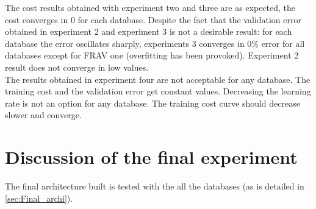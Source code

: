The cost results obtained with experiment two and three are as expected, the cost converges in 0 for each database. Despite the fact that the validation error obtained in experiment 2 and experiment 3 is not a desirable result: for each database the error oscillates sharply, experiments 3 converges in 0\% error for all databases except for FRAV one (overfitting has been provoked). Experiment 2 result does not converge in low values.\\

The results obtained in experiment four are not acceptable for any database. The training cost and the validation error get constant values. Decreasing the learning rate is not an option for any database. The training cost curve should decrease slower and converge.\\

\section{Discussion of the final experiment}
The final architecture built is tested with the all the databases (as is detailed in \ref{sec:Final_archi}).\\


